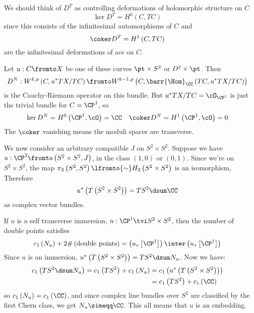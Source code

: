 \documentclass{amsart}
\begin{document}
We should think of $D^T$ as controlling deformations of holomorphic structure on $C$
\begin{equation}
\ker D^T = H^0\left( C , TC \right)
\end{equation}
since this consists of the infinitesimal automorphisms of $C$ and
\begin{equation}
\coker D^T = H^1\left( C , TC \right)
\end{equation}
are the infinitesimal deformations of acs on $C$.

Let $u:C\fromto X$ be one of these curves $\pt \times S^2$
or $D^2 \times \pt$. Then 
\begin{equation}
D^N:
W^{k,p}\left( C , u^* TX / TC \right) \fromto
W^{k-1,p}\left( C , \barr{\Hom}_\CC\left( TC , u^*TX/TC \right) \right)
\end{equation}
is the Cauchy-Riemann operator on this bundle.
But $u^* TX / TC = \cO_{\CP^1}$ is just the trivial bundle for $C = \CP^1$,
so 
\begin{align}
\ker D^N = H^0\left( \CP^1 , \cO \right) = \CC
&&
\coker D^N = H^1\left( \CP^1 , \cO \right) = 0
\end{align}
The $\coker$ vanishing means the moduli spaces are transverse.

We now consider an arbitrary compatible $J$ on $S^2 \times S^2$. 
Suppose we have $u:\CP^2 \fromto \left( S^2 \times S^2 , J \right)$, 
in the class $\left( 1,0 \right)$ or $\left( 0,1 \right)$.
Since we're on $S^2 \times S^2$, the map
$\pi_2\left( S^2, S^2 \right)\lfromto{\sim} H_2\left( S^2 \times S^2 \right)$ is an isomorphism,
Therefore
\begin{equation}
u^*\left( T\left( S^2 \times S^2 \right) \right)
= TS^2 \dsum \CC
\end{equation}
as complex vector bundles.

If $u$ is a self transverse immersion,
$u:\CP^1 \tvi S^2 \times S^2$, then the number of double points satisfies
\begin{equation}
c_1\left( N_u \right) + 2 \#\left( \text{double points} \right) = 
\left( u_*\left[ \CP^1 \right]  \right)\inter \left( u_*\left[ \CP^1 \right] \right)
\end{equation}
Since $u$ is an immersion, 
$u^*\left( T\left( S^2 \times S^2 \right) \right) = TS^2 \dsum N_u$.
Now we have:
\begin{align}
c_1\left( TS^2 \dsum N_u \right) = c_1\left( TS^2 \right) + c_1\left( N_u \right) &=
c_1\left( u^*\left( T\left( S^2 \times S^2 \right) \right) \right) \\
&= c_1\left( TS^2 \right) + c_1\left( \CC \right)
\end{align}
so $c_1\left( N_u \right) = c_1\left( \CC \right)$, and since
complex line bundles over $S^2$ are classified by the first Chern class, we get
$N_u \simeqq \CC$.
This all means that $u$ is an embedding.
\end{document}
